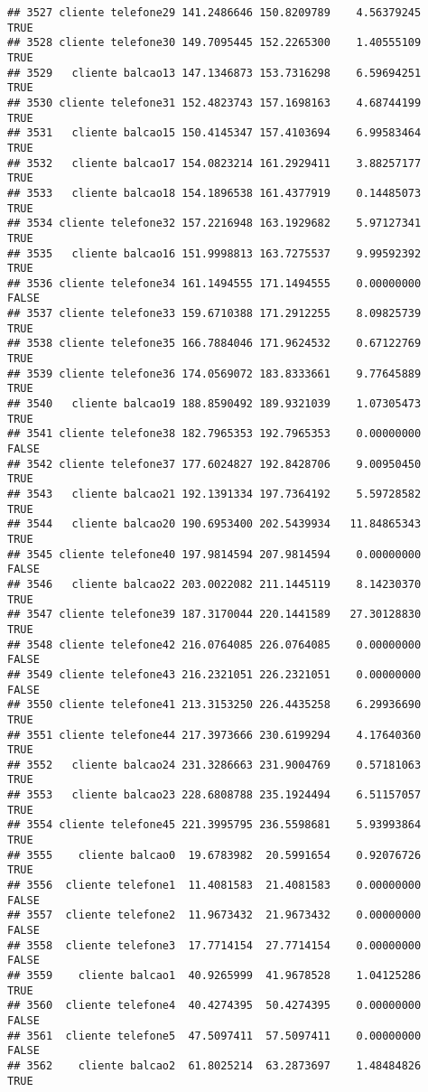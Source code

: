 \documentclass[
]{article}
\begin{document}
\begin{verbatim}
## 3527 cliente telefone29 141.2486646 150.8209789    4.56379245     TRUE
## 3528 cliente telefone30 149.7095445 152.2265300    1.40555109     TRUE
## 3529   cliente balcao13 147.1346873 153.7316298    6.59694251     TRUE
## 3530 cliente telefone31 152.4823743 157.1698163    4.68744199     TRUE
## 3531   cliente balcao15 150.4145347 157.4103694    6.99583464     TRUE
## 3532   cliente balcao17 154.0823214 161.2929411    3.88257177     TRUE
## 3533   cliente balcao18 154.1896538 161.4377919    0.14485073     TRUE
## 3534 cliente telefone32 157.2216948 163.1929682    5.97127341     TRUE
## 3535   cliente balcao16 151.9998813 163.7275537    9.99592392     TRUE
## 3536 cliente telefone34 161.1494555 171.1494555    0.00000000    FALSE
## 3537 cliente telefone33 159.6710388 171.2912255    8.09825739     TRUE
## 3538 cliente telefone35 166.7884046 171.9624532    0.67122769     TRUE
## 3539 cliente telefone36 174.0569072 183.8333661    9.77645889     TRUE
## 3540   cliente balcao19 188.8590492 189.9321039    1.07305473     TRUE
## 3541 cliente telefone38 182.7965353 192.7965353    0.00000000    FALSE
## 3542 cliente telefone37 177.6024827 192.8428706    9.00950450     TRUE
## 3543   cliente balcao21 192.1391334 197.7364192    5.59728582     TRUE
## 3544   cliente balcao20 190.6953400 202.5439934   11.84865343     TRUE
## 3545 cliente telefone40 197.9814594 207.9814594    0.00000000    FALSE
## 3546   cliente balcao22 203.0022082 211.1445119    8.14230370     TRUE
## 3547 cliente telefone39 187.3170044 220.1441589   27.30128830     TRUE
## 3548 cliente telefone42 216.0764085 226.0764085    0.00000000    FALSE
## 3549 cliente telefone43 216.2321051 226.2321051    0.00000000    FALSE
## 3550 cliente telefone41 213.3153250 226.4435258    6.29936690     TRUE
## 3551 cliente telefone44 217.3973666 230.6199294    4.17640360     TRUE
## 3552   cliente balcao24 231.3286663 231.9004769    0.57181063     TRUE
## 3553   cliente balcao23 228.6808788 235.1924494    6.51157057     TRUE
## 3554 cliente telefone45 221.3995795 236.5598681    5.93993864     TRUE
## 3555    cliente balcao0  19.6783982  20.5991654    0.92076726     TRUE
## 3556  cliente telefone1  11.4081583  21.4081583    0.00000000    FALSE
## 3557  cliente telefone2  11.9673432  21.9673432    0.00000000    FALSE
## 3558  cliente telefone3  17.7714154  27.7714154    0.00000000    FALSE
## 3559    cliente balcao1  40.9265999  41.9678528    1.04125286     TRUE
## 3560  cliente telefone4  40.4274395  50.4274395    0.00000000    FALSE
## 3561  cliente telefone5  47.5097411  57.5097411    0.00000000    FALSE
## 3562    cliente balcao2  61.8025214  63.2873697    1.48484826     TRUE

\end{verbatim}
\end{document}
